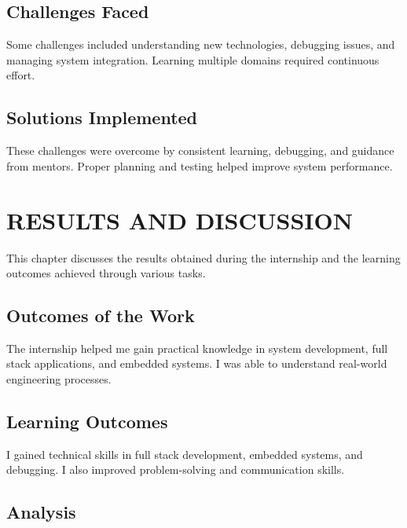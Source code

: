 \documentclass[12pt,a4paper]{report}
\begin{document}
\section{Challenges Faced}

Some challenges included understanding new technologies, debugging issues, and managing system integration. Learning multiple domains required continuous effort.


\section{Solutions Implemented}

These challenges were overcome by consistent learning, debugging, and guidance from mentors. Proper planning and testing helped improve system performance.


\chapter{RESULTS AND DISCUSSION}
\label{ch:results}


This chapter discusses the results obtained during the internship and the learning outcomes achieved through various tasks.




\section{Outcomes of the Work}

The internship helped me gain practical knowledge in system development, full stack applications, and embedded systems. I was able to understand real-world engineering processes.


\section{Learning Outcomes}

I gained technical skills in full stack development, embedded systems, and debugging. I also improved problem-solving and communication skills.


\section{Analysis}
\end{document}
